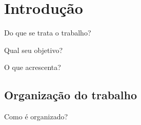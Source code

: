 
\chapter{Introdução}
\label{chap:introducao}

Do que se trata o trabalho?

Qual seu objetivo?

O que acrescenta?

	\section{Organização do trabalho}
		Como é organizado?

